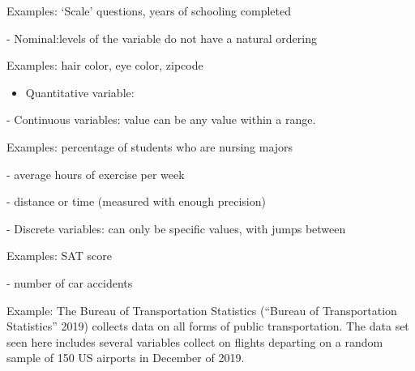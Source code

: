 \documentclass[
]{report}
\providecommand{\tightlist}{%
  \setlength{\itemsep}{0pt}\setlength{\parskip}{0pt}}
\newcommand{\rgi}{\hspace{24pt}}  %
\begin{document}
\rgi \rgi Examples: `Scale' questions, years of schooling completed

\rgi - Nominal:levels of the variable do not have a natural ordering

\rgi \rgi Examples: hair color, eye color, zipcode


\begin{itemize}
\tightlist
\item
  Quantitative variable:
\end{itemize}

\vspace{0.5in}


\rgi - Continuous variables: value can be any value within a range.

\rgi \rgi Examples: percentage of students who are nursing majors

\rgi \rgi \rgi - average hours of exercise per week

\rgi \rgi \rgi - distance or time (measured with enough precision)

\rgi - Discrete variables: can only be specific values, with jumps between

\rgi \rgi Examples: SAT score

\rgi \rgi \rgi - number of car accidents

\newpage

Example: The Bureau of Transportation Statistics ({``Bureau of Transportation Statistics''} 2019) collects data on all forms of public transportation. The data set seen here includes several variables collect on flights departing on a random sample of 150 US airports in December of 2019.

\vspace{1mm}
\end{document}
